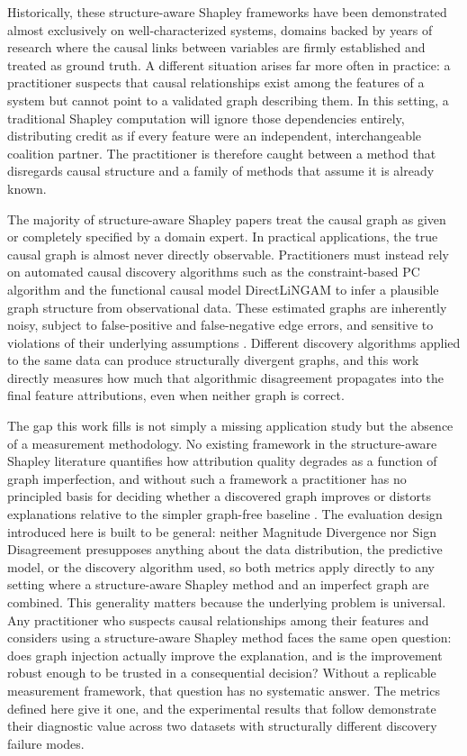 \documentclass[12pt,a4paper,oneside]{article}
\begin{document}
Historically, these structure-aware Shapley frameworks have been demonstrated almost exclusively on well-characterized systems, domains backed by years of research where the causal links between variables are firmly established and treated as ground truth. A different situation arises far more often in practice: a practitioner suspects that causal relationships exist among the features of a system but cannot point to a validated graph describing them. In this setting, a traditional Shapley computation will ignore those dependencies entirely, distributing credit as if every feature were an independent, interchangeable coalition partner. The practitioner is therefore caught between a method that disregards causal structure and a family of methods that assume it is already known.

The majority of structure-aware Shapley papers treat the causal graph as given or completely specified by a domain expert. In practical applications, the true causal graph is almost never directly observable. Practitioners must instead rely on automated causal discovery algorithms such as the constraint-based PC algorithm \citep{Spirtes2000} and the functional causal model DirectLiNGAM \citep{Shimizu2011} to infer a plausible graph structure from observational data. These estimated graphs are inherently noisy, subject to false-positive and false-negative edge errors, and sensitive to violations of their underlying assumptions \citep{Glymour2019}. Different discovery algorithms applied to the same data can produce structurally divergent graphs, and this work directly measures how much that algorithmic disagreement propagates into the final feature attributions, even when neither graph is correct.

The gap this work fills is not simply a missing application study but the absence of a measurement methodology. No existing framework in the structure-aware Shapley literature quantifies how attribution quality degrades as a function of graph imperfection, and without such a framework a practitioner has no principled basis for deciding whether a discovered graph improves or distorts explanations relative to the simpler graph-free baseline \citep{DoshiVelez2017}. The evaluation design introduced here is built to be general: neither Magnitude Divergence nor Sign Disagreement presupposes anything about the data distribution, the predictive model, or the discovery algorithm used, so both metrics apply directly to any setting where a structure-aware Shapley method and an imperfect graph are combined. This generality matters because the underlying problem is universal. Any practitioner who suspects causal relationships among their features and considers using a structure-aware Shapley method faces the same open question: does graph injection actually improve the explanation, and is the improvement robust enough to be trusted in a consequential decision? Without a replicable measurement framework, that question has no systematic answer. The metrics defined here give it one, and the experimental results that follow demonstrate their diagnostic value across two datasets with structurally different discovery failure modes.
\end{document}
